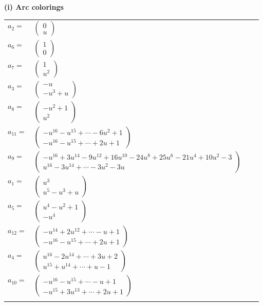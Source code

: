 \documentclass[1p]{elsarticle_modified}
\theoremstyle{definition}
\begin{document}
\flushleft \textbf{(i) Arc colorings}\\
\begin{tabular}{m{7pt} m{180pt} m{7pt} m{180pt} }
\flushright $a_{2}=$&$\begin{pmatrix}0\\u\end{pmatrix}$ \\
\flushright $a_{6}=$&$\begin{pmatrix}1\\0\end{pmatrix}$ \\
\flushright $a_{7}=$&$\begin{pmatrix}1\\u^2\end{pmatrix}$ \\
\flushright $a_{3}=$&$\begin{pmatrix}- u\\- u^3+u\end{pmatrix}$ \\
\flushright $a_{8}=$&$\begin{pmatrix}- u^2+1\\u^2\end{pmatrix}$ \\
\flushright $a_{11}=$&$\begin{pmatrix}- u^{16}- u^{15}+\cdots-6 u^2+1\\- u^{16}- u^{15}+\cdots+2 u+1\end{pmatrix}$ \\
\flushright $a_{9}=$&$\begin{pmatrix}- u^{16}+3 u^{14}-9 u^{12}+16 u^{10}-24 u^8+25 u^6-21 u^4+10 u^2-3\\u^{16}-3 u^{14}+\cdots-3 u^2-3 u\end{pmatrix}$ \\
\flushright $a_{1}=$&$\begin{pmatrix}u^3\\u^5- u^3+u\end{pmatrix}$ \\
\flushright $a_{5}=$&$\begin{pmatrix}u^4- u^2+1\\- u^4\end{pmatrix}$ \\
\flushright $a_{12}=$&$\begin{pmatrix}- u^{14}+2 u^{12}+\cdots- u+1\\- u^{16}- u^{15}+\cdots+2 u+1\end{pmatrix}$ \\
\flushright $a_{4}=$&$\begin{pmatrix}u^{16}-2 u^{14}+\cdots+3 u+2\\u^{15}+u^{14}+\cdots+u-1\end{pmatrix}$ \\
\flushright $a_{10}=$&$\begin{pmatrix}- u^{16}- u^{15}+\cdots- u+1\\- u^{15}+3 u^{13}+\cdots+2 u+1\end{pmatrix}$\\&\end{tabular}
\end{document}
